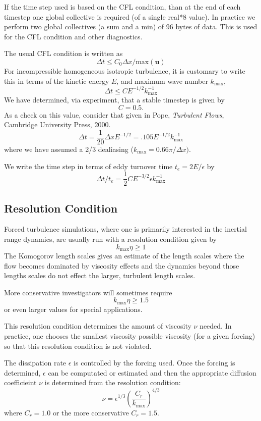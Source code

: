 \documentclass[12pt]{article}
\newcommand{\uv}{\mathbf u}
\begin{document}
If the time step used is based on the CFL condition, than at
the end of each timestep one global collective is required 
(of a single real*8 value).  In practice we perform two global collectives
(a sum and a min) of 96 bytes of data.  This is used for the CFL condition
and other diagnostics.  

The usual CFL condition is written as 
\[
\Delta t \le C_0  { \Delta x } / { \text{max} ( \uv ) }
\]
For incompressible homogeneous isotropic turbulence, it is customary
to write this in terms of the kinetic energy $E$, and maximum
wave number $k_\text{max}$,
\[
\Delta t \le C    E^{-1/2} k_\text{max}^{-1}
\]
We have determined, via experiment, that a stable timestep is
given by 
\[
C=0.5.
\]  
As a check on this value, consider that given
in Pope, {\em Turbulent Flows}, Cambridge University Press, 2000.
\[
 \Delta t = \frac1{20} \Delta x E^{-1/2} = .105   E^{-1/2} k_\text{max}^{-1}
\]
where we have assumed a 2/3 dealiasing ($k_\text{max}=0.66\pi/\Delta x)$.  

We write the time step in terms of eddy turnover time $t_e = 2 E / \epsilon $
by
\[
\Delta t / t_e =  \frac12 C E^{-3/2} \epsilon  k_\text{max}^{-1}
\]



\subsection{Resolution Condition}

Forced turbulence simulations, where one is primarily interested in
the inertial range dynamics, are usually run with a resolution condition
given by
\[
   k_\text{max} \eta \ge 1
\]
The Komogorov length scales gives an estimate of the length scales
where the flow becomes dominated by viscosity effects and the dynamics
beyond those lengths scales do not effect the larger, turbulent length
scales.

More conservative investigators will sometimes require
\[
   k_\text{max} \eta \ge 1.5
\]
or even larger values for special applications.  

This resolution condition determines the amount of viscosity $\nu$
needed.  In practice, one chooses the smallest viscosity possible
viscosity (for a given forcing) so that this resolution condition is
not violated.  

The dissipation rate $\epsilon$ is controlled by the forcing used.
Once the forcing is determined, $\epsilon$ can be computated or
estimated and then the appropriate diffusion coefficieint $\nu$ is
determined from the resolution condition:
\[
 \nu = \epsilon^{1/3} \left( \frac{C_r}{k_\text{max}} \right)^{4/3}
\]
where $C_r=1.0$ or the more conservative $C_r=1.5$. 
\end{document}
